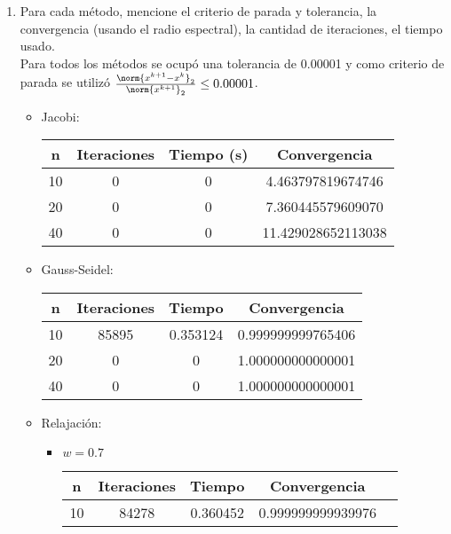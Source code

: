\documentclass{udpreport}
\begin{document}
\begin{enumerate}
\begin{enumerate}
\begin{itemize}
\begin{itemize}
 				\end{itemize}
 			\end{itemize}
 		\item Para cada método, mencione el criterio de parada y tolerancia, la convergencia (usando el radio espectral), la cantidad de iteraciones, el tiempo usado.\\
 			Para todos los métodos se ocupó una tolerancia de 0.00001 y como criterio de parada se utilizó $\frac{\norm{x^{k+1}-x^{k}}_{2}}{\norm{x^{k+1}}_{2}}\leq 0.00001$. \\
 			\begin{itemize}
				\item Jacobi:
					\begin{table}[H]
						\centering
						\begin{tabular}{|c|c|c|c|}
							\hline 
							n & Iteraciones & Tiempo (s) & Convergencia  \\
							\hline
							10 & 0 & 0 & 4.463797819674746  \\
							\hline
							20 & 0 & 0 & 7.360445579609070 \\
							\hline
							40 & 0 & 0 & 11.429028652113038  \\
							\hline
						\end{tabular}
					\end{table}
				\item Gauss-Seidel:
				 \begin{table}[H]
						\centering
						\begin{tabular}{|c|c|c|c|}
							\hline 
							n & Iteraciones & Tiempo & Convergencia  \\
							\hline
							10 & 85895 & 0.353124 & 0.999999999765406  \\
							\hline
							20 & 0 & 0 & 1.000000000000001  \\
							\hline
							40 & 0 & 0 &  1.000000000000001  \\
							\hline
						\end{tabular}
					\end{table}
				\item Relajación:
					\begin{itemize}
					\item $w=0.7$
						\begin{table}[H]
						\centering
						\begin{tabular}{|c|c|c|c|c|}
							\hline 
							n & Iteraciones & Tiempo & Convergencia  \\
							\hline
							10 & 84278 & 0.360452 & 0.999999999939976  \\

\end{tabular}
\end{table}
\end{itemize}
\end{itemize}
\end{enumerate}
\end{enumerate}
\end{document}

